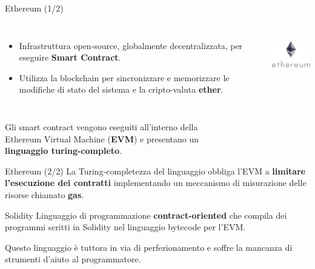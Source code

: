 \documentclass[]{beamer}
\begin{document}

\begin{frame}{Ethereum (1/2)}
	\begin{columns}[c]
		\begin{itemize}
			\item Infrastruttura open-source, globalmente decentralizzata, per eseguire \textbf{Smart Contract}.
			\item Utilizza la blockchain per sincronizzare e memorizzare le modifiche di stato del sistema e la cripto-valuta \textbf{ether}.
		\end{itemize}
			\includegraphics[height=2cm]{img/ethereum.png}
	\end{columns}

	\vspace{0.5cm}

	\begin{center}
		Gli smart contract vengono eseguiti all'interno della\\Ethereum Virtual Machine (\textbf{EVM}) e presentano un\\ \textbf{linguaggio turing-completo}.\textbf{}
	\end{center}
\end{frame}

\begin{frame}{Ethereum (2/2)}
	La Turing-completezza del linguaggio obbliga l'EVM a \textbf{limitare l'esecuzione dei contratti} implementando un meccanismo di misurazione delle risorse chiamato \textbf{gas}.
	
	\vspace{0.5cm}
	
	\begin{block}{Solidity}
		Linguaggio di programmazione \textbf{contract-oriented} che compila dei programmi scritti in Solidity nel linguaggio bytecode per l'EVM. 
	\end{block}

	\begin{center}
		Questo linguaggio è tuttora in via di perfezionamento e soffre la mancanza di strumenti d'aiuto al programmatore.
	\end{center}
\end{frame}
\end{document}

